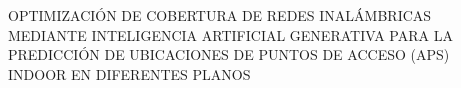 \begin{center}
	\vspace*{10cm}
	{OPTIMIZACIÓN DE COBERTURA DE REDES INALÁMBRICAS MEDIANTE INTELIGENCIA ARTIFICIAL GENERATIVA PARA LA PREDICCIÓN DE UBICACIONES DE PUNTOS DE ACCESO (APS) INDOOR EN DIFERENTES PLANOS}
\end{center}
